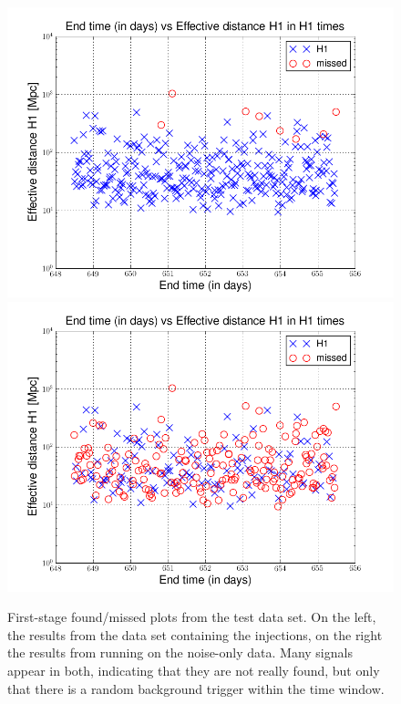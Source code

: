 \begin{figure}
  \includegraphics[width=0.5\linewidth]{figures/ninja2_results/h1-plotinspmissed_full_data_time-eff_dist-log-h1-871147524-606064.png}
  \includegraphics[width=0.5\linewidth]{figures/ninja2_results/h1-plotinspmissed_full_data_time-eff_dist-log-h1-871147524-606064_noiseonly.png} \\
  \caption[First-stage found/missed from the test data set]{
  \label{f:first_stage}
First-stage found/missed plots from the test data set.  On the left,
the results from the data set containing the injections, on the right
the results from running on the noise-only data.  Many signals appear
in both, indicating that they are not really found, but only that
there is a random background trigger within the time window.
}
\end{figure}%




